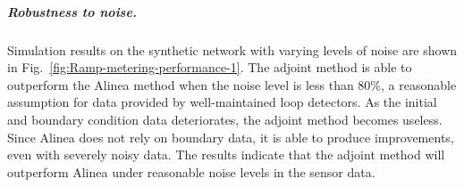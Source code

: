 \subparagraph{Robustness to noise.}
								
Simulation results on the synthetic network with varying levels of
noise are shown in Fig.~\ref{fig:Ramp-metering-performance-1}.
The adjoint method is able to outperform the Alinea method when the
noise level is less than 80\%, a reasonable assumption for data provided
by well-maintained loop detectors. As the initial and boundary condition
data deteriorates, the adjoint method becomes useless. Since Alinea
does not rely on boundary data, it is able to produce improvements,
even with severely noisy data. The results indicate that the adjoint
method will outperform Alinea under reasonable noise levels in the
sensor data.

